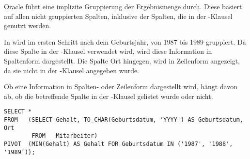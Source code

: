 \begin{merke}
    Oracle führt eine implizite Gruppierung der Ergebnismenge durch. Diese basiert auf allen nicht gruppierten Spalten, inklusive der Spalten, die in der -Klausel genutzt werden.
\end{merke}
In  wird im ersten Schritt nach dem Geburtsjahr, von 1987 bis 1989 gruppiert. Da diese Spalte in der -Klausel verwendet wird, wird diese Information in Spaltenform dargestellt.
Die Spalte Ort hingegen, wird in Zeilenform angezeigt, da sie nicht in der -Klausel angegeben wurde.
\begin{merke}
    Ob eine Information in Spalten- oder Zeilenform dargestellt wird, hängt davon ab, ob die betreffende Spalte in der -Klausel gelistet wurde oder nicht.
\end{merke}
\begin{lstlisting}[language=oracle_sql,caption={Zusätzliche Gruppierungen in einer Pivot-Abfrage},label=sql06_21]
SELECT *
FROM   (SELECT Gehalt, TO_CHAR(Geburtsdatum, 'YYYY') AS Geburtsdatum, Ort
        FROM   Mitarbeiter)
PIVOT  (MIN(Gehalt) AS Gehalt FOR Geburtsdatum IN ('1987', '1988', '1989'));
          \end{lstlisting}
